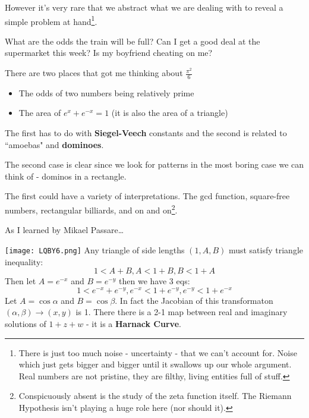 \documentclass[12pt]{article}
\begin{document}
\noindent However it's very rare that we abstract what we are dealing with to reveal a simple problem at hand\footnote{There is just too much noise - uncertainty - that we can't account for.  Noise which just gets bigger and bigger until it swallows up our whole argument.  Real numbers are not pristine, they are filthy, living entities full of stuff.}.\newline

\noindent What are the odds the train will be full?  Can I get a good deal at the supermarket this week?  Is my boyfriend cheating on me?

\newpage

\noindent There are two places that got me thinking about $\frac{\pi^2}{6}$ \newline
\begin{itemize}
\item The odds of two numbers being relatively prime
\item The area of $e^x + e^{-x} = 1$ (it is also the area of a triangle)
\end{itemize}

\noindent The first has to do with \textbf{Siegel-Veech} constants and the second is related to ``amoebas" and \textbf{dominoes}. \newline \newline 

\noindent The second case is clear since we look for patterns in the most boring case we can think of - dominos in a rectangle. \newline \newline 

\noindent The first could have a variety of interpretations.  The $\mathrm{gcd}$ function, square-free numbers, rectangular billiards, and on and on\footnote{Conspicuously absent is the study of the zeta function itself.  The Riemann Hypothesis isn't playing a huge role here (nor should it).}.
\newpage

\noindent As I learned by Mikael Passare\dots

\texttt{[image: LQBY6.png]} \newline
Any triangle of side lengths $(1,A,B)$ must satisfy triangle inequality:
$$ 1 < A + B, A < 1+B, B < 1 + A$$
Then let $A = e^{-x}$ and $B = e^{-y}$ then we have 3 eqs:
$$ 1 < e^{-x} + e^{-y}, e^{-x} < 1 + e^{-y},
e^{-y}< 1 + e^{-x}$$
Let $A = \cos \alpha$ and $B = \cos \beta$.
In fact the Jacobian of this transformaton $(\alpha, \beta) \to (x,y)$ is 1.  There there is a 2-1 map between real and imaginary solutions of $1 + z + w$ - it is a \textbf{Harnack Curve}.
\newpage
\end{document}

